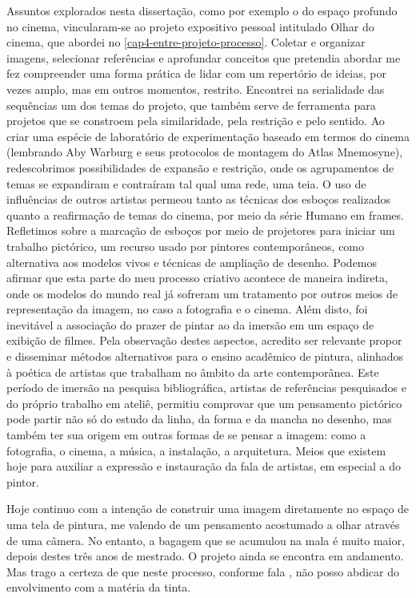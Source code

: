 Assuntos explorados nesta dissertação, como por exemplo o do espaço
profundo no cinema, vincularam-se ao projeto expositivo pessoal
intitulado Olhar do cinema, que abordei no \cref{cap4-entre-projeto-processo}. Coletar e
organizar imagens, selecionar referências e aprofundar conceitos que
pretendia abordar me fez compreender uma forma prática de lidar com um
repertório de ideias, por vezes amplo, mas em outros momentos,
restrito. Encontrei na serialidade das sequências um dos temas do
projeto, que também serve de ferramenta para projetos que se constroem
pela similaridade, pela restrição e pelo sentido. Ao criar uma espécie
de laboratório de experimentação baseado em termos do cinema (lembrando
Aby Warburg e seus protocolos de montagem do Atlas Mnemosyne),
redescobrimos possibilidades de expansão e restrição, onde os
agrupamentos de temas se expandiram e contraíram tal qual uma rede, uma
teia. O uso de influências de outros artistas permeou tanto as técnicas
dos esboços realizados quanto a reafirmação de temas do cinema, por
meio da série Humano em frames. Refletimos sobre a marcação de esboços
por meio de projetores para iniciar um trabalho pictórico, um recurso
usado por pintores contemporâneos, como alternativa aos modelos vivos e
técnicas de ampliação de desenho. Podemos afirmar que esta parte do meu
processo criativo acontece de maneira indireta, onde os modelos do
mundo real já sofreram um tratamento por outros meios de representação
da imagem, no caso a fotografia e o cinema. Além disto, foi inevitável
a associação do prazer de pintar ao da imersão em um espaço de exibição
de filmes. Pela observação destes aspectos, acredito ser relevante
propor e disseminar métodos alternativos para o ensino acadêmico de
pintura, alinhados à poética de artistas que trabalham no âmbito da
arte contemporânea. Este período de imersão na pesquisa bibliográfica,
artistas de referências pesquisados e do próprio trabalho em ateliê,
permitiu comprovar que um pensamento pictórico pode partir não só do
estudo da linha, da forma e da mancha no desenho, mas também ter sua
origem em outras formas de se pensar a imagem: como a fotografia, o
cinema, a música, a instalação, a arquitetura. Meios que existem hoje
para auxiliar a expressão e instauração da fala de artistas, em
especial a do pintor.

Hoje continuo com a intenção de construir uma imagem diretamente no
espaço de uma tela de pintura, me valendo de um pensamento acostumado a
olhar através de uma câmera. No entanto, a bagagem que se acumulou na
mala é muito maior, depois destes três anos de mestrado. O projeto
ainda se encontra em andamento. Mas trago a certeza de que neste
processo, conforme fala
\parencite{sabino2015pintura}, não posso abdicar do envolvimento com a
matéria da tinta.


\printbibliography[title=Referências]

\printpagenotes
